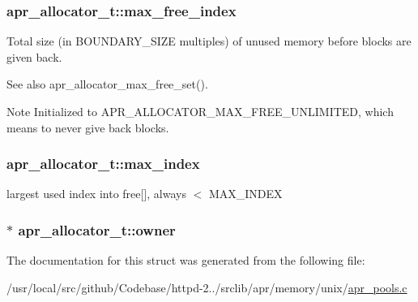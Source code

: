\subsubsection[{\texorpdfstring{max\+\_\+free\+\_\+index}{max_free_index}}]{ apr\+\_\+allocator\+\_\+t\+::max\+\_\+free\+\_\+index}\hypertarget{structapr__allocator__t_a78b567956079277c86dd728c824795d8}{}\label{structapr__allocator__t_a78b567956079277c86dd728c824795d8}
Total size (in B\+O\+U\+N\+D\+A\+R\+Y\+\_\+\+S\+I\+ZE multiples) of unused memory before blocks are given back. \begin{DoxySeeAlso}{See also}
apr\+\_\+allocator\+\_\+max\+\_\+free\+\_\+set(). 
\end{DoxySeeAlso}
\begin{DoxyNote}{Note}
Initialized to A\+P\+R\+\_\+\+A\+L\+L\+O\+C\+A\+T\+O\+R\+\_\+\+M\+A\+X\+\_\+\+F\+R\+E\+E\+\_\+\+U\+N\+L\+I\+M\+I\+T\+ED, which means to never give back blocks. 
\end{DoxyNote}
\subsubsection[{\texorpdfstring{max\+\_\+index}{max_index}}]{ apr\+\_\+allocator\+\_\+t\+::max\+\_\+index}\hypertarget{structapr__allocator__t_a511a854b12091221d19bf4e02178b517}{}\label{structapr__allocator__t_a511a854b12091221d19bf4e02178b517}
largest used index into free\mbox{[}\mbox{]}, always $<$ M\+A\+X\+\_\+\+I\+N\+D\+EX 
\subsubsection[{\texorpdfstring{owner}{owner}}]{$\ast$ apr\+\_\+allocator\+\_\+t\+::owner}\hypertarget{structapr__allocator__t_a7765c4164197b52893dc4523e3104429}{}\label{structapr__allocator__t_a7765c4164197b52893dc4523e3104429}


The documentation for this struct was generated from the following file\+:\begin{DoxyCompactItemize}
\item 
/usr/local/src/github/\+Codebase/httpd-\/2../srclib/apr/memory/unix/\hyperlink{apr__pools_8c}{apr\+\_\+pools.\+c}\end{DoxyCompactItemize}
